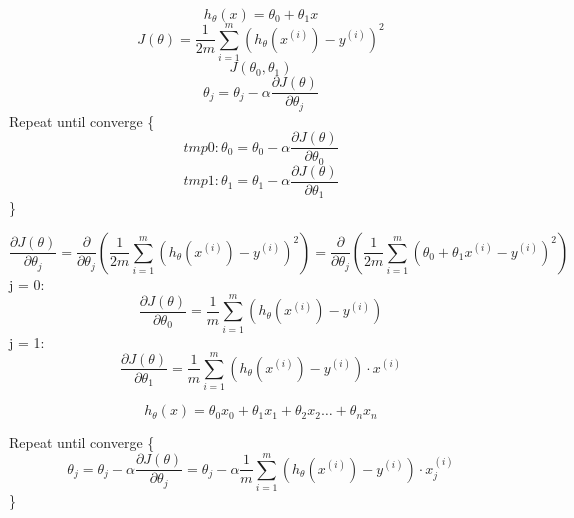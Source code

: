 \documentclass{article}
\begin{document}
\title{}
\author{}
\date{}
\maketitle

$$ h_\theta(x) = \theta_0 + \theta_1x $$
$$ J(\theta)=\frac{1}{2m}\sum_{i=1}^{m}(h_\theta(x^{(i)})-y^{(i)})^2 $$
$$ J(\theta_0, \theta_1) $$
$$ \theta_j = \theta_j-\alpha\frac{\partial J(\theta)}{\partial \theta_j}$$
Repeat until converge \{ $$tmp0: \theta_0=\theta_0-\alpha\frac{\partial J(\theta)}{\partial \theta_0}$$
$$tmp1: \theta_1=\theta_1-\alpha\frac{\partial J(\theta)}{\partial \theta_1}$$
\}

$$\frac{\partial J(\theta)}{\partial \theta_j} = \frac{\partial}{\partial \theta_j}(\frac{1}{2m}\sum_{i=1}^{m}(h_\theta(x^{(i)})-y^{(i)})^2)
=\frac{\partial}{\partial \theta_j}(\frac{1}{2m}\sum_{i=1}^{m}(\theta_0 + \theta_1x^{(i)}-y^{(i)})^2)$$
j = 0:$$\frac{\partial J(\theta)}{\partial \theta_0} = \frac{1}{m}\sum_{i=1}^{m}(h_\theta(x^{(i)})-y^{(i)})$$
j = 1:$$\frac{\partial J(\theta)}{\partial \theta_1} = \frac{1}{m}\sum_{i=1}^{m}(h_\theta(x^{(i)})-y^{(i)})\cdot x^{(i)}$$

$$h_\theta(x) = \theta_0x_0 + \theta_1x_1 + \theta_2x_2\dots + \theta_nx_n$$

Repeat until converge \{ $$\theta_j=\theta_j-\alpha\frac{\partial J(\theta)}{\partial \theta_j}=
\theta_j-\alpha\frac{1}{m}\sum_{i=1}^{m}(h_\theta(x^{(i)})-y^{(i)})\cdot x_j^{(i)}$$
\}
\end{document}
